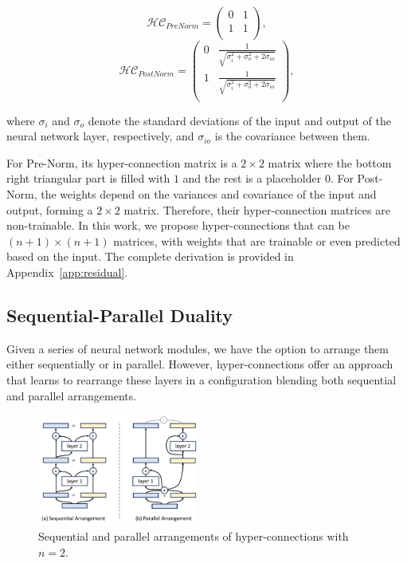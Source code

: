 \documentclass{article} %
\begin{document}
\begin{multicols}{2}
  \begin{equation}
  \label{eq:hc_prenorm}
    \mathcal{HC}_{PreNorm}=\begin{pmatrix}
    0 & 1 \\
    1 & 1 \\
    \end{pmatrix},
    \end{equation}
  \break
  \begin{equation}
  \label{eq:hc_postnorm}
  \mathcal{HC}_{PostNorm}=
    \begin{pmatrix}
    0 & \frac{1}{\sqrt{\sigma_{i}^2+\sigma_{o}^2 + 2\sigma_{io}}} \\
    1 & \frac{1}{\sqrt{\sigma_{i}^2+\sigma_{o}^2 + 2\sigma_{io}}} \\
    \end{pmatrix},
  \end{equation}
\end{multicols}
where $\sigma_{i}$ and $\sigma_{o}$ denote the standard deviations of the input and output of the neural network layer, respectively, and $\sigma_{io}$ is the covariance between them.

For Pre-Norm, its hyper-connection matrix is a $2\times 2$ matrix where the bottom right triangular part is filled with $1$ and the rest is a placeholder $0$. For Post-Norm,  the weights depend on the variances and covariance of the input and output, forming a $2\times 2$ matrix. Therefore, their hyper-connection matrices are non-trainable. In this work, we propose hyper-connections that can be $(n+1)\times (n+1)$ matrices, with weights that are trainable or even predicted based on the input. The complete derivation is provided in Appendix~\ref{app:residual}.

\subsection{Sequential-Parallel Duality}
\label{seq_par_dual}
Given a series of neural network modules, we have the option to arrange them either sequentially or in parallel. However, hyper-connections offer an approach that learns to rearrange these layers in a configuration blending both sequential and parallel arrangements.
\begin{figure}[h]
    \centering
    \includegraphics[width=0.47\textwidth]{fig/s_p_duality.pdf}
    \caption{Sequential and parallel arrangements of hyper-connections with $n=2$. }
    \label{fig:s_p_duality}
\end{figure}
\end{document}
